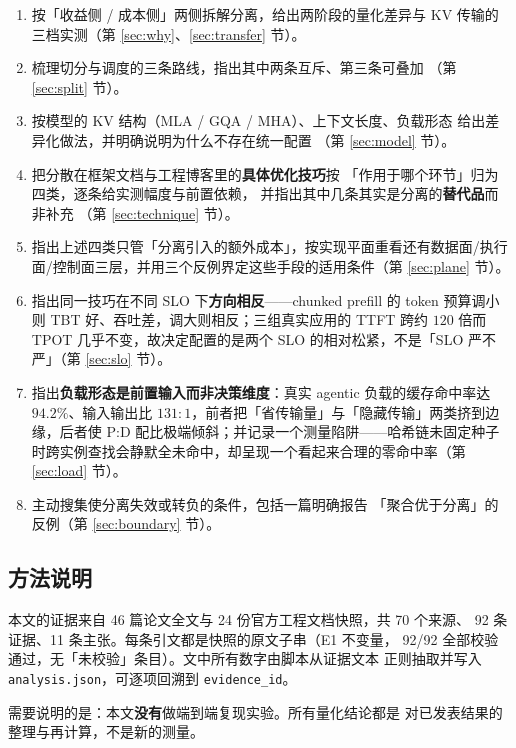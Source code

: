 \begin{enumerate}[leftmargin=1.4em,itemsep=2pt,topsep=3pt]
  \item 按「收益侧 / 成本侧」两侧拆解分离，给出两阶段的量化差异与
        KV 传输的三档实测（第 \ref{sec:why}、\ref{sec:transfer} 节）。
  \item 梳理切分与调度的三条路线，指出其中两条互斥、第三条可叠加
        （第 \ref{sec:split} 节）。
  \item 按模型的 KV 结构（MLA / GQA / MHA）、上下文长度、负载形态
        给出差异化做法，并明确说明为什么不存在统一配置
        （第 \ref{sec:model} 节）。
  \item 把分散在框架文档与工程博客里的\textbf{具体优化技巧}按
        「作用于哪个环节」归为四类，逐条给实测幅度与前置依赖，
        并指出其中几条其实是分离的\textbf{替代品}而非补充
        （第 \ref{sec:technique} 节）。
  \item 指出上述四类只管「分离引入的额外成本」，按实现平面重看还有数据面/执行面/控制面三层，并用三个反例界定这些手段的适用条件（第 \ref{sec:plane} 节）。
  \item 指出同一技巧在不同 SLO 下\textbf{方向相反}——chunked prefill 的 token 预算调小则 TBT 好、吞吐差，调大则相反；三组真实应用的 TTFT 跨约 $120$ 倍而 TPOT 几乎不变，故决定配置的是两个 SLO 的相对松紧，不是「SLO 严不严」（第 \ref{sec:slo} 节）。
  \item 指出\textbf{负载形态是前置输入而非决策维度}：真实 agentic 负载的缓存命中率达 $94.2\%$、输入输出比 $131:1$，前者把「省传输量」与「隐藏传输」两类挤到边缘，后者使 P:D 配比极端倾斜；并记录一个测量陷阱——哈希链未固定种子时跨实例查找会静默全未命中，却呈现一个看起来合理的零命中率（第 \ref{sec:load} 节）。
  \item 主动搜集使分离失效或转负的条件，包括一篇明确报告
        「聚合优于分离」的反例（第 \ref{sec:boundary} 节）。
\end{enumerate}

\subsection{方法说明}

本文的证据来自 46 篇论文全文与 24 份官方工程文档快照，共 70 个来源、
92 条证据、11 条主张。每条引文都是快照的原文子串（E1 不变量，
92/92 全部校验通过，无「未校验」条目）。文中所有数字由脚本从证据文本
正则抽取并写入 \texttt{analysis.json}，可逐项回溯到 \texttt{evidence\_id}。

需要说明的是：本文\textbf{没有}做端到端复现实验。所有量化结论都是
对已发表结果的整理与再计算，不是新的测量。

